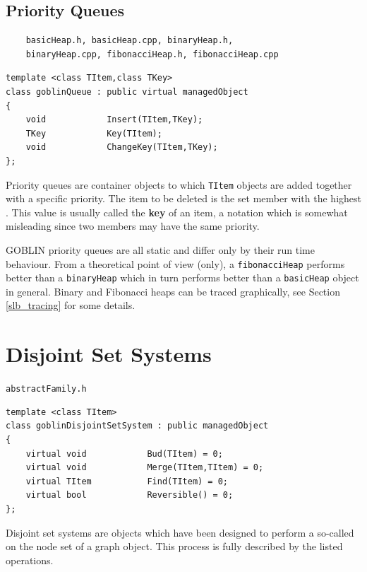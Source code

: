 \documentclass[a4paper,11pt,twoside]{book}
\begin{document}
\begin{multicols}{2}
\subsection{Priority Queues}
\myincludes
\begin{verbatim}
    basicHeap.h, basicHeap.cpp, binaryHeap.h,
    binaryHeap.cpp, fibonacciHeap.h, fibonacciHeap.cpp
\end{verbatim}
\begin{mymethods}
\begin{verbatim}
template <class TItem,class TKey>
class goblinQueue : public virtual managedObject
{
    void            Insert(TItem,TKey);
    TKey            Key(TItem);
    void            ChangeKey(TItem,TKey);
};
\end{verbatim}
\end{mymethods}
Priority queues are container objects to which \verb/TItem/ objects are added
together with a specific priority. The item to be deleted is the set member
with the highest . This value is usually called the {\bf key} of
an item, a notation which is somewhat misleading since two members may have the same
priority.

GOBLIN priority queues are all static and differ only by their run time
behaviour. From a theoretical point of view (only), a \verb/fibonacciHeap/ performs
better than a \verb/binaryHeap/ which in turn performs better than a
\verb/basicHeap/ object in general. Binary and Fibonacci heaps can be traced
graphically, see Section \ref{slb_tracing} for some details.


\section{Disjoint Set Systems}
\label{slb42}
\myinclude\verb/abstractFamily.h/
\begin{mymethods}
\begin{verbatim}
template <class TItem>
class goblinDisjointSetSystem : public managedObject
{
    virtual void            Bud(TItem) = 0;
    virtual void            Merge(TItem,TItem) = 0;
    virtual TItem           Find(TItem) = 0;
    virtual bool            Reversible() = 0;
};
\end{verbatim}
\end{mymethods}
Disjoint set systems are objects which have been designed to perform a
so-called  on the node set of a graph object.
This process is fully described by the listed operations.


\end{multicols}
\end{document}
